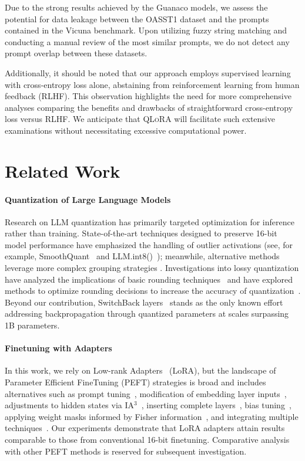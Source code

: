 Due to the strong results achieved by the {Guanaco} models, we assess the potential for data leakage between the OASST1 dataset and the prompts contained in the Vicuna benchmark. Upon utilizing fuzzy string matching and conducting a manual review of the most similar prompts, we do not detect any prompt overlap between these datasets.

Additionally, it should be noted that our approach employs supervised learning with cross-entropy loss alone, abstaining from reinforcement learning from human feedback (RLHF). This observation highlights the need for more comprehensive analyses comparing the benefits and drawbacks of straightforward cross-entropy loss versus RLHF. We anticipate that \textsc{QLoRA} will facilitate such extensive examinations without necessitating excessive computational power.

\section{Related Work}

\paragraph{Quantization of Large Language Models} Research on LLM quantization has primarily targeted optimization for inference rather than training. State-of-the-art techniques designed to preserve 16-bit model performance have emphasized the handling of outlier activations (see, for example, SmoothQuant~\citep{xiao2022smoothquant} and LLM.int8()~\citep{dettmers2022llm}); meanwhile, alternative methods leverage more complex grouping strategies \citep{park2022nuqmm, yao2022zeroquant}. Investigations into lossy quantization have analyzed the implications of basic rounding techniques~\citep{dettmers2022case,zeng2022glm,pope2022efficiently} and have explored methods to optimize rounding decisions to increase the accuracy of quantization~\citep{frantar2022gptq}. Beyond our contribution, SwitchBack layers~\citep{wortsman2023stable} stands as the only known effort addressing backpropagation through quantized parameters at scales surpassing 1B parameters.

\paragraph{Finetuning with Adapters} In this work, we rely on Low-rank Adapters~\citep{hu2021lora} (LoRA), but the landscape of Parameter Efficient FineTuning (PEFT) strategies is broad and includes alternatives such as prompt tuning~\citep{qin2021learning,lester2021power,li2021prefix}, modification of embedding layer inputs~\citep{an2022input}, adjustments to hidden states via IA$^3$~\citep{liu2022few}, inserting complete layers~\citep{houlsby2019parameter}, bias tuning~\citep{zaken2021bitfit}, applying weight masks informed by Fisher information~\citep{sung2021training}, and integrating multiple techniques~\citep{henderson2021compacter}. Our experiments demonstrate that LoRA adapters attain results comparable to those from conventional 16-bit finetuning. Comparative analysis with other PEFT methods is reserved for subsequent investigation.

